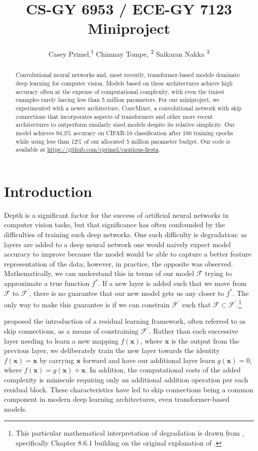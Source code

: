 \documentclass[letterpaper]{article} %
\title{CS-GY 6953 / ECE-GY 7123 Miniproject}
\author {
    Casey Primel,\textsuperscript{\rm 1}
    Chimnay Tompe, \textsuperscript{\rm 2}
    Saikaran Nakka \textsuperscript{\rm 3}
}
\begin{document}
\maketitle

\begin{abstract}
Convolutional neural networks and, most recently, transformer-based models dominate deep learning for computer vision. Models based on these architectures achieve high accuracy often at the expense of computational complexity, with even the tiniest examples rarely having less than 5 million parameters. For our miniproject, we experimented with a newer architecture, ConvMixer, a convolutional network with skip connections that incorporates aspects of transformers and other more recent architectures to outperform similarly sized models despite its relative simplicity. Our model achieves 94.3\% accuracy on CIFAR-10 classification after 100 training epochs while using less than 12\% of our allocated 5 million parameter budget. Our code is available at \url{https://github.com/cprimel/cautious-fiesta}.
\end{abstract}

\section{Introduction}

Depth is a significant factor for the success of artificial neural networks in computer vision tasks, but that significance has often confounded by the difficulties of training such deep networks. One such difficulty is degradation: as layers are added to a deep neural network one would naively expect model accuracy to improve because the model would be able to capture a better feature representation of the data; however, in practice, the opposite was observed. Mathematically, we can understand this in terms of our model $\mathcal{F}$ trying to approximate a true function $f^*$. If a new layer is added such that we move from $\mathcal{F}$ to $\mathcal{F}^\prime$, there is no guarantee that our new model gets us any closer to $f^*$. The only way to make this guarantee is if we can constrain $\mathcal{F}^\prime$ such that $\mathcal{F} \subset \mathcal{F}^\prime$.\footnote{This particular mathematical interpretation of degradation is drawn from \citet{zhang2021dive}, specifically Chapter 8.6.1 building on the original explanation of \citet{he2015}.}

\citet{he2015} proposed the introduction of a residual learning framework, often referred to as skip connections, as a means of constraining $\mathcal{F}^\prime$. Rather than each successive layer needing to learn a new mapping $f(\mathbf{x})$, where $\mathbf{x}$ is the output from the previous layer, we deliberately train the new layer towards the identity $f(\mathbf{x})=\mathbf{x}$ by carrying $\mathbf{x}$ forward and have our additional layer learn $g(\mathbf{x}) = 0$, where $f(\mathbf{x})= g(\mathbf{x}) + \mathbf{x}$. In addition, the computational costs of the added complexity is miniscule requiring only an additional addition operation per each residual block. These characteristics have led to skip connections being a common component in modern deep learning architectures, even transformer-based models. 
\end{document}
